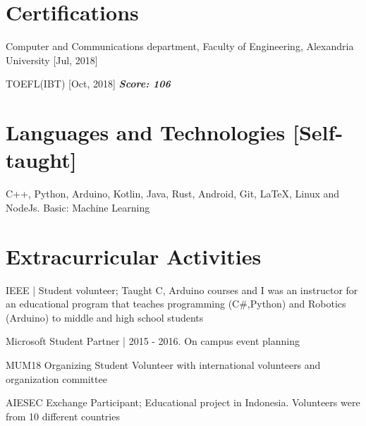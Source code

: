 \documentclass[paper=a4,fontsize=11pt]{scrartcl} %
\newcommand{\BoldIt}[1]{\textbf{\textit{#1}}}
\begin{document}
\section{Certifications}
\begin{itemize*}
	\item Computer and Communications department, Faculty of Engineering, Alexandria University [Jul, 2018] %
	\item TOEFL(IBT) [Oct, 2018] \BoldIt{Score: 106}
\end{itemize*}
\section{Languages and Technologies [Self-taught]}
\begin{itemize*}
	\item C++, Python, Arduino, Kotlin, Java, Rust, Android, Git, \LaTeX, Linux and NodeJs. Basic: Machine Learning
\end{itemize*}
\section{Extracurricular Activities}

\begin{itemize*}
	\item IEEE | Student volunteer; Taught C, Arduino courses and I was an instructor for an educational program that teaches programming (C\#,Python) and Robotics (Arduino) to middle and high school students
	\item Microsoft Student Partner | 2015 - 2016. On campus event planning
	\item MUM18 Organizing Student Volunteer with international volunteers and organization committee
	\item AIESEC Exchange Participant; Educational project in Indonesia. Volunteers were from 10 different countries
\end{itemize*}
\end{document}
